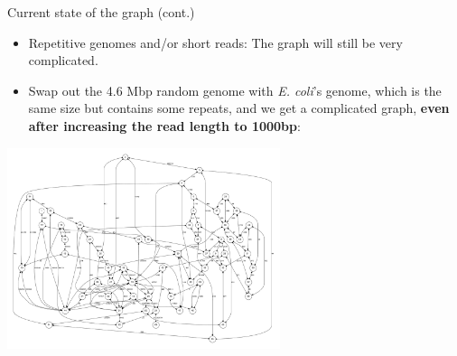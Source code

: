 \documentclass[xcolor=dvipsnames]{beamer}
\begin{document}
\begin{frame}{Current state of the graph (cont.)}
	\begin{itemize}
		\item Repetitive genomes and/or short reads: The graph will still be
		very complicated.
		\item Swap out the 4.6 Mbp random genome with {\it E. coli}'s genome,
		which is the same size but contains some repeats, and we get a
		complicated graph, {\bf even after increasing the read length to
		1000bp}:
	\end{itemize}
	\begin{center}
		\includegraphics[width=0.6\textwidth]{E_coli.pdf}
	\end{center}
\end{frame}

\end{document}
